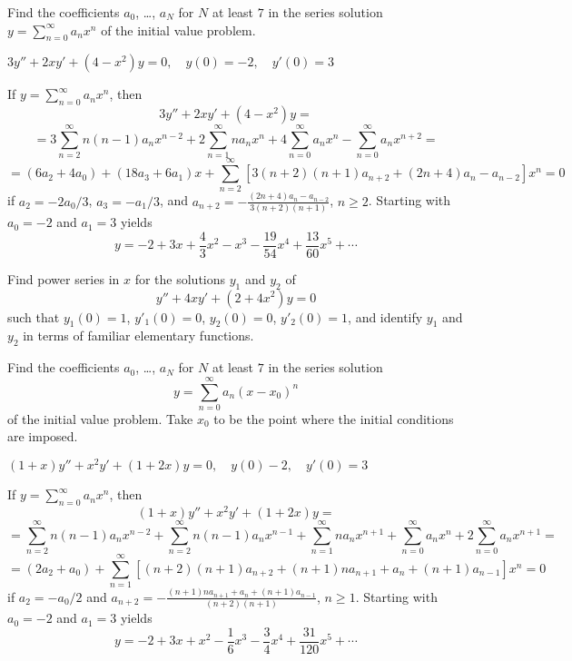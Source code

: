 \documentclass{ximera}
\begin{document}
\begin{problem}\label{exer:7.3.38}
Find
the coefficients  $a_0$, \dots, $a_N$ for $N$ at least $7$ in the series
solution
$y=\sum_{n=0}^\infty a_nx^n$
 of the initial value problem.
 
$3y''+2xy'+(4-x^2)y=0,\quad y(0)=-2,\quad y'(0)=3$

\begin{solution}
    If $y=\sum_{n=0}^\infty a_nx^n$, then
$$3y''+2xy'+(4-x^2)y=$$
$$=3\sum_{n=2}^\infty n(n-1)a_nx^{n-2}
+2\sum_{n=1}^\infty na_nx^n
+4\sum_{n=0}^\infty a_nx^n
-\sum_{n=0}^\infty a_nx^{n+2}=$$
$$=(6a_2+4a_0)+(18a_3+6a_1)x+
\sum_{n=2}^\infty[3(n+2)(n+1)a_{n+2}+(2n+4)a_n-a_{n-2}]x^n=0$$ if
$a_2=-2a_0/3$, $a_3=-a_1/3$, and
$a_{n+2}=-\frac{(2n+4)a_n-a_{n-2}}{3(n+2)(n+1)}$,
 $n\geq 2$.
Starting with $a_0=-2$ and $a_1=3$ yields
$$y=-2+3x+\frac{4}{3}x^2-x^3-\frac{19}{54}x^4+\frac{13}{60}x^5+\cdots$$
\end{solution}
\end{problem}


\begin{problem}\label{exer:7.3.39}
  Find power series in $x$ for the solutions $y_1$
 and $y_2$ of
$$
y''+4xy'+(2+4x^2)y=0
$$
such that $y_1(0)=1$,\;  $y'_1(0)=0$,\;  $y_2(0)=0$,\;
 $y'_2(0)=1$, and identify $y_1$  and $y_2$ in terms of familiar elementary
functions.
\end{problem}


\begin{problem}\label{exer:7.3.40}
Find
the coefficients  $a_0$, \dots, $a_N$ for $N$ at least $7$
in the series solution
$$
y=\sum_{n=0}^\infty a_n(x-x_0)^n
$$
of the initial value problem. Take $x_0$ to be the point where the
initial conditions are imposed.

$(1+x)y''+x^2y'+(1+2x)y=0,\quad y(0)-2,\quad y'(0)=3$

\begin{solution}
    If $y=\sum_{n=0}^\infty a_nx^n$, then
$$(1+x)y''+x^2y'+(1+2x)y=$$
$$=\sum_{n=2}^\infty n(n-1)a_nx^{n-2}
+ \sum_{n=2}^\infty n(n-1)a_nx^{n-1}
+\sum_{n=1}^\infty na_nx^{n+1}
+\sum_{n=0}^\infty a_nx^n
+2\sum_{n=0}^\infty a_nx^{n+1}=$$
$$=(2a_2+a_0)+
\sum_{n=1}^\infty[(n+2)(n+1)a_{n+2}+(n+1)na_{n+1}+a_n+(n+1)a_{n-1}]x^n=0$$
if
$a_2=-a_0/2$ and
$a_{n+2}=-\frac{(n+1)na_{n+1}+a_n+(n+1)a_{n-1}}{(n+2)(n+1)}$,
 $n\geq 1$.
Starting with $a_0=-2$ and $a_1=3$ yields
$$y=-2+3x+x^2-\frac{1}{6}x^3-\frac{3}{4}x^4+\frac{31}{120}x^5+\cdots$$
\end{solution}
\end{problem}
\end{document}
